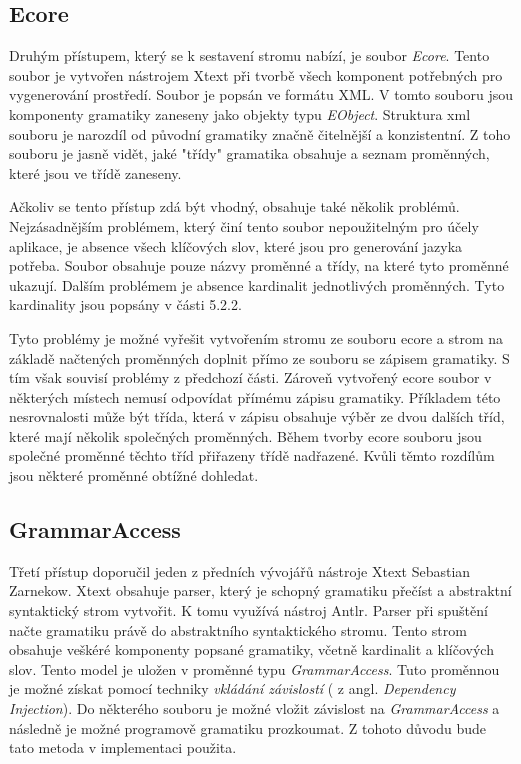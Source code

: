 \subsection{Ecore}
Druhým přístupem, který se k sestavení stromu nabízí, je soubor \textit{Ecore}. Tento soubor je vytvořen nástrojem Xtext při tvorbě všech komponent potřebných pro vygenerování prostředí. Soubor je popsán ve formátu XML. V tomto souboru jsou komponenty gramatiky zaneseny jako objekty typu \textit{EObject}. Struktura xml souboru je narozdíl od původní gramatiky značně čitelnější a konzistentní. Z toho souboru je jasně vidět, jaké "třídy" gramatika obsahuje a seznam proměnných, které jsou ve třídě zaneseny.

Ačkoliv se tento přístup zdá být vhodný, obsahuje také několik problémů. Nejzásadnějším problémem, který činí tento soubor nepoužitelným pro účely aplikace, je absence všech klíčových slov, které jsou pro generování jazyka potřeba. Soubor obsahuje pouze názvy proměnné a třídy, na které tyto proměnné ukazují. Dalším problémem je absence kardinalit jednotlivých proměnných. Tyto kardinality jsou popsány v části 5.2.2.

Tyto problémy je možné vyřešit vytvořením stromu ze souboru ecore a strom na základě načtených proměnných doplnit přímo ze souboru se zápisem gramatiky. S tím však souvisí problémy z předchozí části. Zároveň vytvořený ecore soubor v některých místech nemusí odpovídat přímému zápisu gramatiky. Příkladem této nesrovnalosti může být třída, která v zápisu obsahuje výběr ze dvou dalších tříd, které mají několik společných proměnných. Během tvorby ecore souboru jsou společné proměnné těchto tříd přiřazeny třídě nadřazené. Kvůli těmto rozdílům jsou některé proměnné obtížné dohledat. 

\subsection{GrammarAccess}
Třetí přístup doporučil jeden z předních vývojářů nástroje Xtext Sebastian Zarnekow. Xtext obsahuje parser, který je schopný gramatiku přečíst a abstraktní syntaktický strom vytvořit. K tomu využívá nástroj Antlr. Parser při spuštění načte gramatiku právě do abstraktního syntaktického stromu. Tento strom obsahuje veškéré komponenty popsané gramatiky, včetně kardinalit a klíčových slov. Tento model je uložen v proměnné typu \textit{GrammarAccess}. Tuto proměnnou je možné získat pomocí techniky \textit{vkládání závislostí} ( z angl. \textit{Dependency Injection}). Do některého souboru je možné vložit závislost na \textit{GrammarAccess} a následně je možné programově gramatiku prozkoumat. Z tohoto důvodu bude tato metoda v implementaci použita. 

